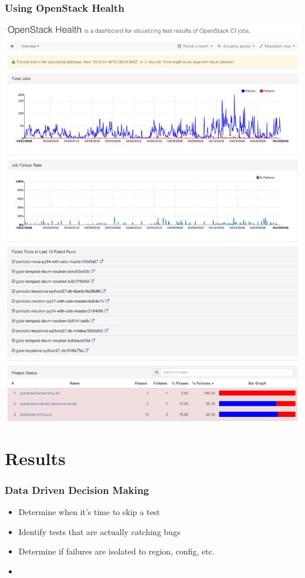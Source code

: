 \documentclass[aspectratio=169,11pt,hyperref={colorlinks=true}]{beamer}
\begin{document}
\begin{frame}
    \frametitle{Using OpenStack Health}
    \begin{center}
        \includegraphics[height=.9\textheight]{HomePage.png}
    \end{center}
\end{frame}

\section{Results}
\begin{frame}
    \frametitle{Data Driven Decision Making}
    \begin{itemize}
        \item Determine when it's time to skip a test
        \item Identify tests that are actually catching bugs
        \item Determine if failures are isolated to region, config, etc.
        \item
    \end{itemize}
\end{frame}
\end{document}
